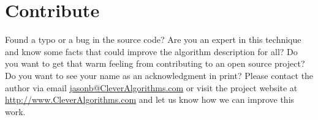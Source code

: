 \documentclass[a4paper, 11pt]{article}
\begin{document}
% 
% 
\section{Contribute}
\label{sec:contribute}
Found a typo or a bug in the source code? 
Are you an expert in this technique and know some facts that could improve the algorithm description for all?
Do you want to get that warm feeling from contributing to an open source project? Do you want to see your name as an acknowledgment in print?
Please contact the author via email \url{jasonb@CleverAlgorithms.com} or visit the project website at \url{http://www.CleverAlgorithms.com} and let us know how we can improve this work.



\end{document}
